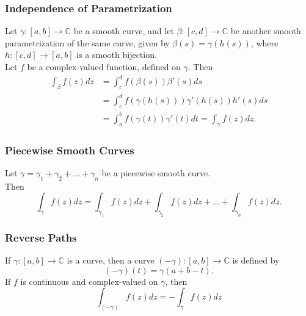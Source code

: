 \documentclass{article}
\begin{document}
\subsubsection{Independence of Parametrization}
Let $\gamma : [a, b] \to \mathbb{C}$ be a smooth curve, and let $\beta : [c, d] \to \mathbb{C}$ be another smooth parametrization of the same curve, given by $\beta (s) = \gamma (h(s))$, where $h :[c, d] \to [a, b]$ is a smooth bijection. \\
Let $f$ be a complex-valued function, defined on $\gamma$. Then
\begin{align*}
\int_{\beta} f(z)dz &= \int_c^d f(\beta (s))\beta '(s)ds \\
&= \int_c^d f(\gamma (h(s)))\gamma '(h(s)) h'(s)ds\\
&= \int_a^b f(\gamma (t))\gamma '(t)dt = \int_{\gamma} f(z)dz.
\end{align*}

\subsubsection{Piecewise Smooth Curves}
Let $\gamma = \gamma_1 + \gamma_2 + ... + \gamma_n$ be a piecewise smooth curve.\\
Then
\begin{equation*}
\int_{\gamma}f(z)dz = \int_{\gamma_1}f(z)dz + \int_{\gamma_2}f(z)dz + ... + \int_{\gamma_n}f(z)dz.
\end{equation*}
\begin{figure}[h]
\centering
{}
\end{figure}

\subsubsection{Reverse Paths}
If $\gamma : [a, b] \to \mathbb{C}$ is a curve, then a curve $(-\gamma) : [a, b] \to \mathbb{C}$ is defined by 
\begin{equation*}
(-\gamma)(t) = \gamma(a + b - t).
\end{equation*}
If $f$ is continuous and complex-valued on $\gamma$, then
\begin{equation*}
\int_{(-\gamma)}f(z)dz = -\int_{\gamma}f(z)dz
\end{equation*}
\end{document}
